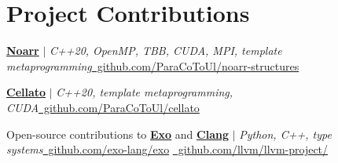 \section{Project Contributions}
\resumeSubHeadingListStart
  \resumeProjectHeading
    {\href{https://github.com/ParaCoToUl/noarr-structures}{\textbf{Noarr}} $|$ \emph{C++20, OpenMP, TBB, CUDA, MPI, template metaprogramming}}{\href{https://github.com/ParaCoToUl/noarr-structures}{\footnotesize{}\ github.com/ParaCoToUl/noarr-structures}}
  \resumeItemListStart
  \resumeItemListEnd

  \resumeProjectHeading
    {\href{https://github.com/ParaCoToUl/cellato}{\textbf{Cellato}} $|$ \emph{C++20, template metaprogramming, CUDA}}{\href{https://github.com/ParaCoToUl/cellato}{\footnotesize{}\ github.com/ParaCoToUl/cellato}}
  \resumeItemListStart
  \resumeItemListEnd

  \resumeProjectHeading
    {Open-source contributions to \href{https://github.com/exo-lang/exo}{\textbf{Exo}} and \href{https://github.com/llvm/llvm-project/}{\textbf{Clang}} $|$ \emph{Python, C++, type systems}}{\href{https://github.com/exo-lang/exo}{\footnotesize{}\ github.com/exo-lang/exo} \href{https://github.com/llvm/llvm-project/}{\footnotesize{}\ github.com/llvm/llvm-project/}}
  \resumeItemListStart
  \resumeItemListEnd
\resumeSubHeadingListEnd
